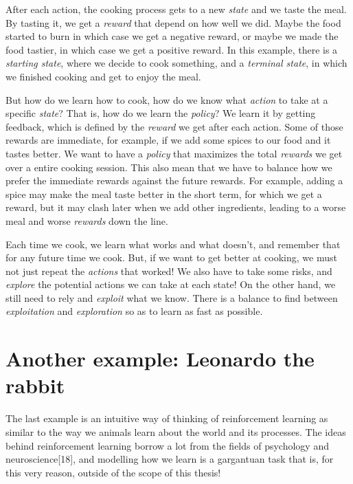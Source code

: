 \documentclass[
  letterpaper,
]{report}
\theoremstyle{plain}
\theoremstyle{definition}
\theoremstyle{definition}
\theoremstyle{remark}
\begin{document}
After each action, the cooking process gets to a new \emph{state} and we
taste the meal. By tasting it, we get a \emph{reward} that depend on how
well we did. Maybe the food started to burn in which case we get a
negative reward, or maybe we made the food tastier, in which case we get
a positive reward. In this example, there is a \emph{starting state},
where we decide to cook something, and a \emph{terminal state}, in which
we finished cooking and get to enjoy the meal.

But how do we learn how to cook, how do we know what \emph{action} to
take at a specific \emph{state}? That is, how do we learn the
\emph{policy}? We learn it by getting feedback, which is defined by the
\emph{reward} we get after each action. Some of those rewards are
immediate, for example, if we add some spices to our food and it tastes
better. We want to have a \emph{policy} that maximizes the total
\emph{rewards} we get over a entire cooking session. This also mean that
we have to balance how we prefer the immediate rewards against the
future rewards. For example, adding a spice may make the meal taste
better in the short term, for which we get a reward, but it may clash
later when we add other ingredients, leading to a worse meal and worse
\emph{rewards} down the line.

Each time we cook, we learn what works and what doesn't, and remember
that for any future time we cook. But, if we want to get better at
cooking, we must not just repeat the \emph{actions} that worked! We also
have to take some risks, and \emph{explore} the potential actions we can
take at each state! On the other hand, we still need to rely and
\emph{exploit} what we know. There is a balance to find between
\emph{exploitation} and \emph{exploration} so as to learn as fast as
possible.

\hypertarget{another-example-leonardo-the-rabbit}{%
\section{Another example: Leonardo the
rabbit}\label{another-example-leonardo-the-rabbit}}

The last example is an intuitive way of thinking of reinforcement
learning as similar to the way we animals learn about the world and its
processes. The ideas behind reinforcement learning borrow a lot from the
fields of psychology and neuroscience{[}18{]}, and modelling how we
learn is a gargantuan task that is, for this very reason, outside of the
scope of this thesis!
\end{document}
